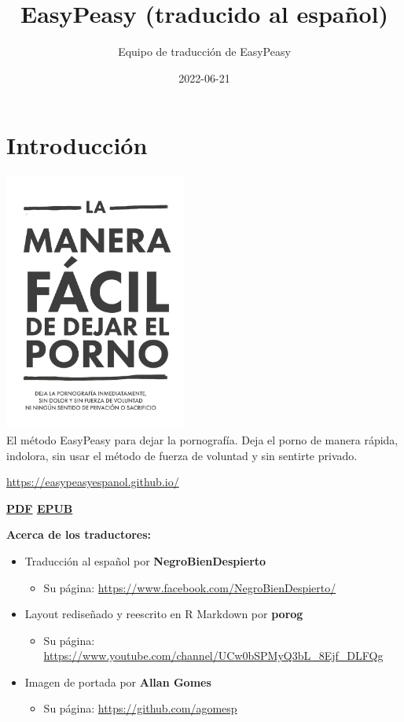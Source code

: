 \documentclass[
  spanish,
  openany]{book}
\title{EasyPeasy (traducido al español)}
\author{Equipo de traducción de EasyPeasy}
\date{2022-06-21}
\providecommand{\tightlist}{%
  \setlength{\itemsep}{0pt}\setlength{\parskip}{0pt}}
\let\oldurl\url
\renewcommand\url{\renewcommand\UrlFont{\ttfamily\color{blue}}\oldurl}
\let\oldhref\href
\renewcommand{\href}[2]{\textcolor{blue}{\oldhref{#1}{#2}}}
\begin{document}
\maketitle

{
\setcounter{tocdepth}{1}
\tableofcontents
}
\hypertarget{introduccion}{%
\chapter{Introducción}\label{introduccion}}

\includegraphics[width=0.45\textwidth,height=0.45\textheight]{img-cover.png}\\

El método EasyPeasy para dejar la pornografía. Deja el porno de manera rápida, indolora, sin usar el método de fuerza de voluntad y sin sentirte privado.

\url{https://easypeasyespanol.github.io/}

{\textbf{\href{https://easypeasyespanol.github.io/easypeasyespanol.pdf}{PDF} \textbar{} \href{https://easypeasyespanol.github.io/easypeasyespanol.epub}{EPUB}}}

\textbf{Acerca de los traductores:}

\begin{itemize}
\tightlist
\item
  Traducción al español por \textbf{NegroBienDespierto}

  \begin{itemize}
  \tightlist
  \item
    Su página: \url{https://www.facebook.com/NegroBienDespierto/}
  \end{itemize}
\item
  Layout rediseñado y reescrito en R Markdown por \textbf{porog}

  \begin{itemize}
  \tightlist
  \item
    Su página: \url{https://www.youtube.com/channel/UCw0bSPMyQ3bL_8Ejf_DLFQg}
  \end{itemize}
\item
  Imagen de portada por \textbf{Allan Gomes}

  \begin{itemize}
  \tightlist
  \item
    Su página: \url{https://github.com/agomesp}
  \end{itemize}
\end{itemize}
\end{document}
